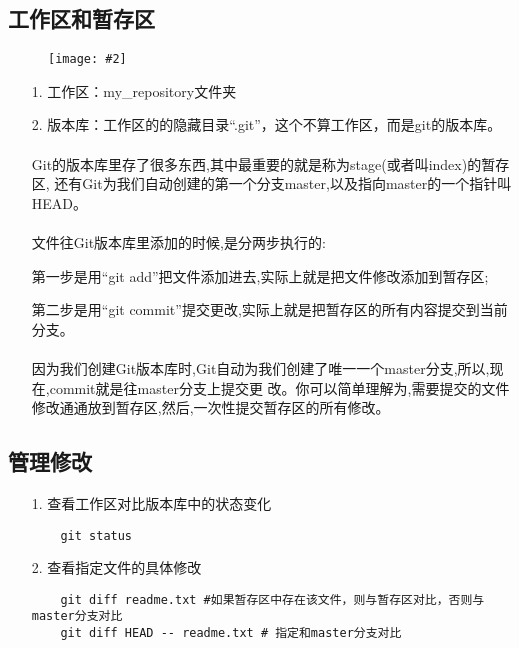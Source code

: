 \documentclass[a4paper,left=1.5cm,right=1.5cm,11pt]{article}
\newcommand{\sizedfic}[2]{\begin{figure}[H]
		\center
		\texttt{[image: \#2]}
	\end{figure}}
\begin{document}
\subsection{工作区和暂存区}
\sizedfic{0.6}{git.png}
\begin{itemize}
	\item[1.]工作区：my\_repository文件夹
	\item[2.]版本库：工作区的的隐藏目录“.git”，这个不算工作区，而是git的版本库。\\\\
	Git的版本库里存了很多东西,其中最重要的就是称为stage(或者叫index)的暂存区,
	还有Git为我们自动创建的第一个分支master,以及指向master的一个指针叫HEAD。\\\\
	文件往Git版本库里添加的时候,是分两步执行的: \par
	第一步是用“git add”把文件添加进去,实际上就是把文件修改添加到暂存区; \par
	第二步是用“git commit”提交更改,实际上就是把暂存区的所有内容提交到当前分支。\\\\
	因为我们创建Git版本库时,Git自动为我们创建了唯一一个master分支,所以,现在,commit就是往master分支上提交更
	改。你可以简单理解为,需要提交的文件修改通通放到暂存区,然后,一次性提交暂存区的所有修改。
\end{itemize}
\subsection{管理修改}
\begin{itemize}
	\item[1.]查看工作区对比版本库中的状态变化
	\begin{lstlisting}
	git status
	\end{lstlisting}
	\item[2.]查看指定文件的具体修改
	\begin{lstlisting}
	git diff readme.txt #如果暂存区中存在该文件，则与暂存区对比，否则与master分支对比
	git diff HEAD -- readme.txt # 指定和master分支对比
	\end{lstlisting}
\end{itemize}
\end{document}

